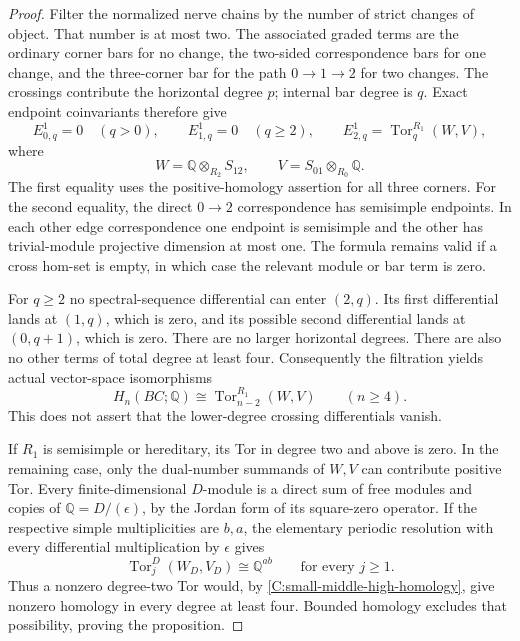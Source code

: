 \begin{proof}
Filter the normalized nerve chains by the number of strict
changes of object.  That number is at most two.  The associated
graded terms are the ordinary corner bars for no change,
the two-sided correspondence bars for one change, and the
three-corner bar for the path $0\to1\to2$ for two changes.
The crossings contribute the horizontal degree $p$; internal
bar degree is $q$.  Exact endpoint coinvariants therefore give
\[
 E^1_{0,q}=0\quad(q>0),\qquad
 E^1_{1,q}=0\quad(q\geq2),\qquad
 E^1_{2,q}=\operatorname{Tor}^{R_1}_q(W,V),
\]
where
\[
 W=\mathbb Q\otimes_{R_2}S_{12},\qquad
 V=S_{01}\otimes_{R_0}\mathbb Q.
\]
The first equality uses the positive-homology assertion for
all three corners.  For the second equality, the direct
$0\to2$ correspondence has semisimple endpoints.  In each
other edge correspondence one endpoint is semisimple and the
other has trivial-module projective dimension at most one.
The formula remains valid if a cross hom-set is empty, in
which case the relevant module or bar term is zero.

For $q\geq2$ no spectral-sequence differential can enter
$(2,q)$.  Its first differential lands at $(1,q)$, which is
zero, and its possible second differential lands at
$(0,q+1)$, which is zero.  There are no larger horizontal
degrees.  There are also no other terms of total degree at
least four.  Consequently the filtration yields actual
vector-space isomorphisms
\begin{equation}\label{C:small-middle-high-homology}
 H_n(BC;\mathbb Q)
 \cong \operatorname{Tor}^{R_1}_{n-2}(W,V)
 \qquad(n\geq4).
\end{equation}
This does not assert that the lower-degree crossing
differentials vanish.

If $R_1$ is semisimple or hereditary, its Tor in degree two
and above is zero.  In the remaining case, only the
dual-number summands of $W,V$ can contribute positive Tor.
Every finite-dimensional $D$-module is a direct sum of free
modules and copies of $\mathbb Q=D/(\epsilon)$, by the
Jordan form of its square-zero operator.  If the respective
simple multiplicities are $b,a$, the elementary periodic
resolution with every differential multiplication by
$\epsilon$ gives
\[
 \operatorname{Tor}^D_j(W_D,V_D)\cong\mathbb Q^{ab}
 \qquad\text{for every }j\geq1.
\]
Thus a nonzero degree-two Tor would, by
\eqref{C:small-middle-high-homology}, give nonzero homology
in every degree at least four.  Bounded homology excludes
that possibility, proving the proposition.
\end{proof}

